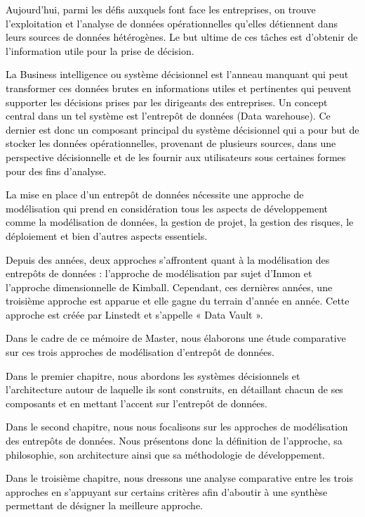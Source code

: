 \documentclass[a4paper,12pt]{report}
\begin{document}
\textcolor{black}{Aujourd’hui, parmi les défis auxquels font face les entreprises, on trouve l’exploitation et l’analyse de données opérationnelles qu’elles détiennent dans leurs sources de données hétérogènes. Le but ultime de ces tâches est d’obtenir de l’information utile pour la prise de décision. }


\textcolor{black}{La Business intelligence ou système décisionnel est l’anneau manquant qui peut transformer ces données brutes en informations utiles et pertinentes qui peuvent supporter les décisions prises par les dirigeants des entreprises. Un concept central dans un tel système est l’entrepôt de données (Data warehouse). Ce dernier est donc un composant principal du système décisionnel qui a pour but de stocker les données opérationnelles, provenant de plusieurs sources, dans une perspective décisionnelle et de les fournir aux utilisateurs sous certaines formes pour des fins d’analyse.}


\textcolor{black}{La mise en place d’un entrepôt de données nécessite une approche de modélisation qui prend en considération tous les aspects de développement comme la modélisation de données, la gestion de projet, la gestion des risques, le déploiement et bien d’autres aspects essentiels.}

\textcolor{black}{Depuis des années, deux approches s’affrontent quant à la modélisation des entrepôts de données : l’approche de modélisation par sujet d’Inmon et l’approche dimensionnelle de Kimball. Cependant, ces dernières années, une troisième approche est apparue et elle gagne du terrain d’année en année. Cette approche est créée par Linstedt et s’appelle « Data Vault ».}

\textcolor{black}{Dans le cadre de ce mémoire de Master, nous élaborons une étude comparative sur ces trois approches de modélisation d’entrepôt de données.
}

\textcolor{black}{Dans le premier chapitre, nous abordons les systèmes décisionnels et l’architecture autour de laquelle ils sont construits, en détaillant chacun de ses composants et en mettant l’accent sur l’entrepôt de données.}


\textcolor{black}{Dans le second chapitre, nous nous focalisons sur les approches de modélisation des entrepôts de données. Nous présentons donc la définition de l’approche, sa philosophie, son architecture ainsi que sa méthodologie de développement.}

\textcolor{black}{Dans le troisième chapitre, nous dressons une analyse comparative entre les trois approches en s’appuyant sur certains critères afin d’aboutir à une synthèse permettant de désigner la meilleure approche.
}
\end{document}
